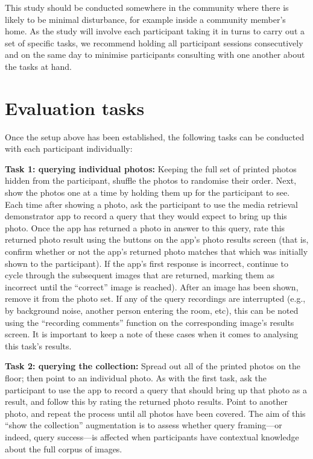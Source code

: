 \documentclass[10pt,twoside,openright]{report}
\begin{document}
This study should be conducted somewhere in the community where there is likely to be minimal disturbance, for example inside a community member's home.
As the study will involve each participant taking it in turns to carry out a set of specific tasks, we recommend holding all participant sessions consecutively and on the same day to minimise participants consulting with one another about the tasks at hand.


\section{Evaluation tasks}
Once the setup above has been established, the following tasks can be conducted with each participant individually:

\textbf{Task 1: querying individual photos:} Keeping the full set of printed photos hidden from the participant, shuffle the photos to randomise their order.
Next, show the photos one at a time by holding them up for the participant to see.
Each time after showing a photo, ask the participant to use the media retrieval demonstrator app to record a query that they would expect to bring up this photo.
Once the app has returned a photo in answer to this query, rate this returned photo result using the buttons on the app's photo results screen (that is, confirm whether or not the app's returned photo matches that which was initially shown to the participant).
If the app's first response is incorrect, continue to cycle through the subsequent images that are returned, marking them as incorrect until the ``correct'' image is reached).
After an image has been shown, remove it from the photo set.
If any of the query recordings are interrupted (e.g., by background noise, another person entering the room, etc), this can be noted using the ``recording comments'' function on the corresponding image's results screen.
It is important to keep a note of these cases when it comes to analysing this task's results. 

\textbf{Task 2: querying the collection:} Spread out all of the printed photos on the floor; then point to an individual photo.
As with the first task, ask the participant to use the app to record a query that should bring up that photo as a result, and follow this by rating the returned photo results.
Point to another photo, and repeat the process until all photos have been covered.
The aim of this ``show the collection'' augmentation is to assess whether query framing---or indeed, query success---is affected when participants have contextual knowledge about the full corpus of images. 
\end{document}
